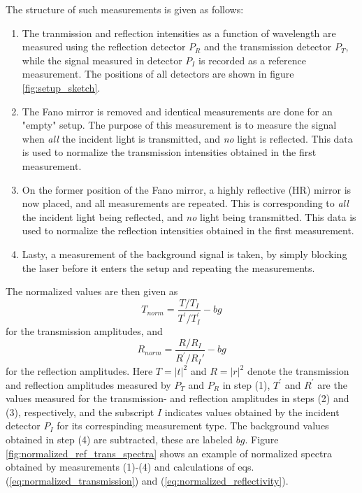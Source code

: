 The structure of such measurements is given as follows: 
\begin{enumerate}
    \item The tranmission and reflection intensities as a function of wavelength are measured using the reflection detector $P_R$ and the transmission detector $P_T$, while the signal measured in detector $P_I$ is recorded as a reference measurement. The positions of all detectors are shown in figure \ref{fig:setup_sketch}. 
    \item The Fano mirror is removed and identical measurements are done for an "empty" setup. The purpose of this measurement is to measure the signal when \emph{all} the incident light is transmitted, and \emph{no} light is reflected. This data is used to normalize the transmission intensities obtained in the first measurement. 
    \item On the former position of the Fano mirror, a highly reflective (HR) mirror is now placed, and all measurements are repeated. This is corresponding to \emph{all} the incident light being reflected, and \emph{no} light being transmitted. This data is used to normalize the reflection intensities obtained in the first measurement.
    \item Lasty, a measurement of the background signal is taken, by simply blocking the laser before it enters the setup and repeating the measurements. 
\end{enumerate}

The normalized values are then given as
\begin{equation}
    T_{norm} = \frac{T/T_I}{T^{\prime}/T_I^{\prime}} - bg
    \label{eq:normalized_transmission}
\end{equation}
for the transmission amplitudes, and
\begin{equation}
    R_{norm} = \frac{R/R_I}{R^{\prime}/R_I{\prime}} - bg
    \label{eq:normalized_reflectivity}
\end{equation}
for the reflection amplitudes. Here $T=|t|^2$ and $R=|r|^2$ denote the transmission and reflection amplitudes measured by $P_T$ and $P_R$ in step (1), $T^{\prime}$ and $R^{\prime}$ are the values measured for the transmission- and reflection amplitudes in steps (2) and (3), respectively, and the subscript $I$ indicates values obtained by the incident detector $P_I$ for its correspinding measurement type. The background values obtained in step (4) are subtracted, these are labeled $bg$. Figure \ref{fig:normalized_ref_trans_spectra} shows an example of normalized spectra obtained by measurements (1)-(4) and calculations of eqs. (\ref{eq:normalized_transmission}) and (\ref{eq:normalized_reflectivity}).

